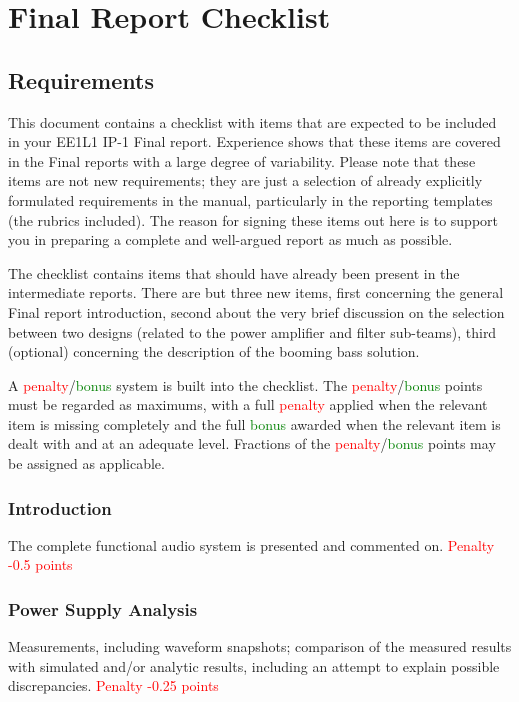 \chapter{Final Report Checklist}
\label{chapter:FinalReportCheckList}

\section{Requirements}
This document contains a checklist with items that are expected to be included in your EE1L1 IP-1
Final report. Experience shows that these items are covered in the Final reports with a large degree
of variability. Please note that these items are not new requirements; they are just a selection of already explicitly formulated requirements in the manual, particularly in the reporting templates (the rubrics included). The reason for signing these items out here is to support you in preparing a complete and well-argued report as much as possible.

The checklist contains items that should have already been present in the intermediate reports. There
are but three new items, first concerning the general Final report introduction, second about the very brief discussion on the selection between two designs (related to the power amplifier and filter sub-teams), third (optional) concerning the description of the booming bass solution.

A \textcolor{red}{penalty}/\textcolor{Green}{bonus} system is built into the checklist. The \textcolor{red}{penalty}/\textcolor{Green}{bonus} points must be regarded as maximums, with a full \textcolor{red}{penalty} applied when the relevant item is missing completely and the full \textcolor{Green}{bonus} awarded when the relevant item is dealt with and at an adequate level. Fractions of the \textcolor{red}{penalty}/\textcolor{Green}{bonus} points may be assigned as applicable.

\subsection{Introduction}
The complete functional audio system is presented and commented on. \textcolor{red}{Penalty -0.5 points}

\subsection{Power Supply Analysis}
Measurements, including waveform snapshots; comparison of the measured results with simulated and/or
analytic results, including an attempt to explain possible discrepancies. \textcolor{red}{Penalty -0.25 points}

